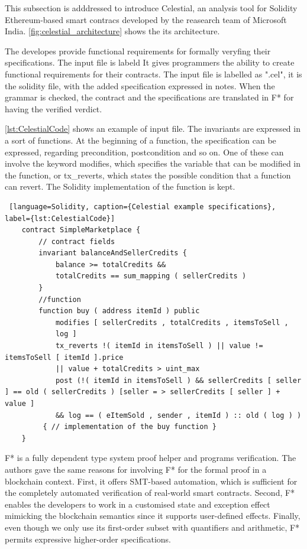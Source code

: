 This subsection is adddressed to introduce Celestial, 
an analysis tool for Solidity Ethereum-based smart contracs developed by the reasearch team of Microsoft India.
\autoref{fig:celestial_architecture} shows the its architecture. 

The developes provide functional requirements for formally veryfing their specifications. The input file is labeld 
It gives programmers the ability to create functional requirements for their contracts. 
The input file is labelled as ".cel", it is the solidity file, with the added specification expressed in notes. 
When the grammar is checked, the contract and the specifications are translated in F* for having the verified verdict. 

\autoref*{lst:CelestialCode} shows an example of input file. The invariants are expressed in a sort of functions. 
At the beginning of a function, the specification can be expressed, regarding precondition, postcondition and so on. 
One of these can involve the keyword modifies, which specifies the variable that can be modified in the function, or tx\_reverts, 
which states the possible condition that a function can revert. 
The Solidity implementation of the function is kept.
\begin{lstlisting} [language=Solidity, caption={Celestial example specifications}, label={lst:CelestialCode}]
    contract SimpleMarketplace {
        // contract fields
        invariant balanceAndSellerCredits {
            balance >= totalCredits &&
            totalCredits == sum_mapping ( sellerCredits )
        }
        //function 
        function buy ( address itemId ) public
            modifies [ sellerCredits , totalCredits , itemsToSell ,
            log ]
            tx_reverts !( itemId in itemsToSell ) || value != itemsToSell [ itemId ].price
            || value + totalCredits > uint_max
            post (!( itemId in itemsToSell ) && sellerCredits [ seller ] == old ( sellerCredits ) [seller = > sellerCredits [ seller ] + value ]
            && log == ( eItemSold , sender , itemId ) :: old ( log ) )
         { // implementation of the buy function }
    }
\end{lstlisting}

F* is a fully dependent type system proof helper and programs verification. 
The authors gave the same reasons for involving F* for the formal proof in a blockchain context.
First, it offers SMT-based automation, which is sufficient for the completely automated verification of real-world smart contracts. 
Second, F* enables the developers to work in a customised state and exception effect mimicking the blockchain semantics since it supports user-defined effects. 
Finally, even though we only use its first-order subset with quantifiers and arithmetic, F* permits expressive higher-order specifications.

